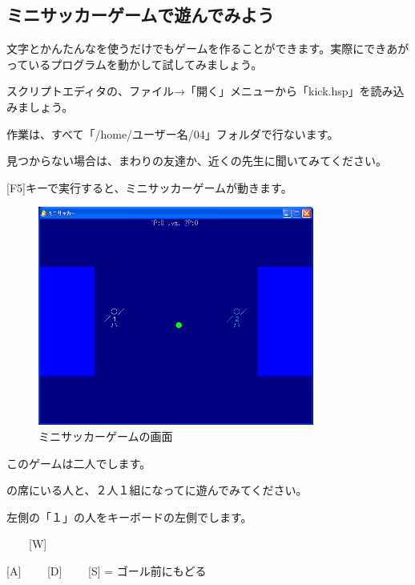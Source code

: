 \newpage
\subsection{ミニサッカーゲームで遊んでみよう}



文字とかんたんなを使うだけでもゲームを作ることができます。実際にできあがっているプログラムを動かして試してみましょう。

スクリプトエディタの、ファイル→「開く」メニューから「kick.hsp」を読み込みましょう。

作業は、すべて「/home/ユーザー名/04」フォルダで行ないます。

見つからない場合は、まわりの友達か、近くの先生に聞いてみてください。



[F5]キーで実行すると、ミニサッカーゲームが動きます。



\begin{figure}[H]
    \begin{center}
      \includegraphics[keepaspectratio,width=9.075cm,height=7.197cm]{text04-img/s_kick.png}
      \caption{ミニサッカーゲームの画面}
    \end{center}
    \label{fig:prog_menu}
\end{figure}


このゲームは二人でします。

の席にいる人と、２人１組になってに遊んでみてください。

左側の「１」の人をキーボードの左側でします。




\ \ \ \ [W]

[A] \ \ \ \ [D] \ \ \ \ [S] = ゴール前にもどる

